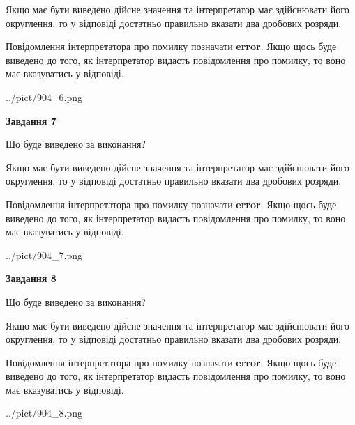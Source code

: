 \documentclass[12pt, ukrainian]{article}
\begin{document}
{\begin {Large}
Якщо має бути виведено дійсне значення та інтерпретатор має здійснювати його округлення, 
то у відповіді достатньо правильно вказати два дробових розряди.

Повідомлення інтерпретатора про помилку позначати \textbf{error}.
Якщо щось буде виведено до того, як інтерпретатор видасть повідомлення про помилку, 
то воно має вказуватись у відповіді. \par

\begin{center}
	{../pict/904_6.png}
\end{center}
\newpage

{\begin {center}\textbf{Завдання 7}\end {center}}\par
Що буде виведено за виконання? \par

Якщо має бути виведено дійсне значення та інтерпретатор має здійснювати його округлення, 
то у відповіді достатньо правильно вказати два дробових розряди.

Повідомлення інтерпретатора про помилку позначати \textbf{error}.
Якщо щось буде виведено до того, як інтерпретатор видасть повідомлення про помилку, 
то воно має вказуватись у відповіді. \par

\begin{center}
	{../pict/904_7.png}
\end{center}
\newpage

{\begin {center}\textbf{Завдання 8}\end {center}}\par
Що буде виведено за виконання? \par

Якщо має бути виведено дійсне значення та інтерпретатор має здійснювати його округлення, 
то у відповіді достатньо правильно вказати два дробових розряди.

Повідомлення інтерпретатора про помилку позначати \textbf{error}.
Якщо щось буде виведено до того, як інтерпретатор видасть повідомлення про помилку, 
то воно має вказуватись у відповіді. \par

\begin{center}
	{../pict/904_8.png}
\end{center}
\newpage


\end{Large}}
\end{document}
